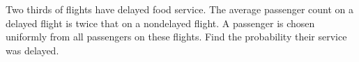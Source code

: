 Two thirds of flights have delayed food service. The average passenger count on a delayed flight is twice that on a nondelayed flight. A passenger is chosen uniformly from all passengers on these flights. Find the probability their service was delayed.
